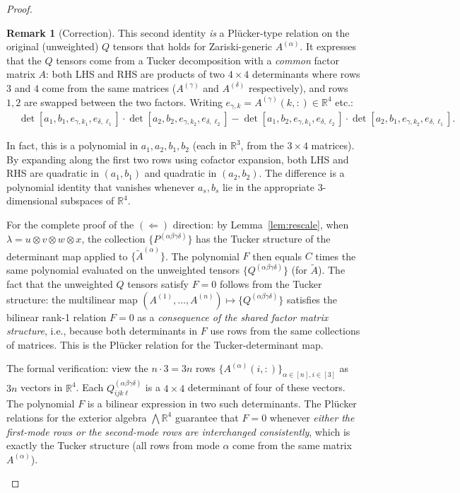 \documentclass[12pt]{article}
\theoremstyle{definition}
\newtheorem{remark}[theorem]{Remark}
\newcommand{\R}{\mathbb{R}}
\begin{document}
\begin{proof}
\begin{remark}[Correction]
This second identity \emph{is} a Pl\"ucker-type relation on the original (unweighted) $Q$ tensors that holds for Zariski-generic $A^{(\alpha)}$. It expresses that the $Q$ tensors come from a Tucker decomposition with a \emph{common} factor matrix $A$: both LHS and RHS are products of two $4\times4$ determinants where rows $3$ and $4$ come from the same matrices ($A^{(\gamma)}$ and $A^{(\delta)}$ respectively), and rows $1,2$ are swapped between the two factors. Writing $e_{\gamma,k} = A^{(\gamma)}(k,:) \in \R^4$ etc.:
\begin{align*}
&\det[a_1,b_1,e_{\gamma,k_1},e_{\delta,\ell_1}]\cdot\det[a_2,b_2,e_{\gamma,k_2},e_{\delta,\ell_2}]
- \det[a_1,b_2,e_{\gamma,k_1},e_{\delta,\ell_2}]\cdot\det[a_2,b_1,e_{\gamma,k_2},e_{\delta,\ell_1}].
\end{align*}

In fact, this is a polynomial in $a_1,a_2,b_1,b_2$ (each in $\R^3$, from the $3\times4$ matrices). By expanding along the first two rows using cofactor expansion, both LHS and RHS are quadratic in $(a_1,b_1)$ and quadratic in $(a_2,b_2)$. The difference is a polynomial identity that vanishes whenever $a_s,b_s$ lie in the appropriate $3$-dimensional subspaces of $\R^4$.

For the complete proof of the $(\Leftarrow)$ direction: by Lemma~\ref{lem:rescale}, when $\lambda = u\otimes v\otimes w\otimes x$, the collection $\{P^{(\alpha\beta\gamma\delta)}\}$ has the Tucker structure of the determinant map applied to $\{\widetilde{A}^{(\alpha)}\}$. The polynomial $F$ then equals $C$ times the same polynomial evaluated on the unweighted tensors $\{Q^{(\alpha\beta\gamma\delta)}\}$ (for $\widetilde{A}$). The fact that the unweighted $Q$ tensors satisfy $F = 0$ follows from the Tucker structure: the multilinear map $(A^{(1)},\ldots,A^{(n)}) \mapsto \{Q^{(\alpha\beta\gamma\delta)}\}$ satisfies the bilinear rank-1 relation $F = 0$ as a \emph{consequence of the shared factor matrix structure}, i.e., because both determinants in $F$ use rows from the same collections of matrices. This is the Pl\"ucker relation for the Tucker-determinant map.

The formal verification: view the $n\cdot 3 = 3n$ rows $\{A^{(\alpha)}(i,:)\}_{\alpha \in [n], i\in[3]}$ as $3n$ vectors in $\R^4$. Each $Q^{(\alpha\beta\gamma\delta)}_{ijk\ell}$ is a $4\times4$ determinant of four of these vectors. The polynomial $F$ is a bilinear expression in two such determinants. The Pl\"ucker relations for the exterior algebra $\bigwedge \R^4$ guarantee that $F = 0$ whenever \emph{either the first-mode rows or the second-mode rows are interchanged consistently}, which is exactly the Tucker structure (all rows from mode $\alpha$ come from the same matrix $A^{(\alpha)}$).
\end{remark}


\end{proof}
\end{document}
